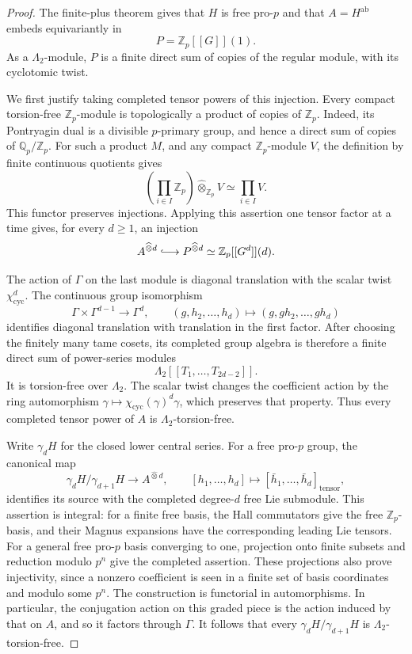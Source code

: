 \begin{proof}
The finite-plus theorem gives that \(H\) is free pro-\(p\) and
that \(A=H^{\mathrm{ab}}\) embeds equivariantly in
\[
 P=\mathbb Z_p[[G]](1).
\]
As a \(\Lambda_2\)-module, \(P\) is a finite direct sum of
copies of the regular module, with its cyclotomic twist.

We first justify taking completed tensor powers of this
injection.  Every compact torsion-free \(\mathbb Z_p\)-module
is topologically a product of copies of \(\mathbb Z_p\).
Indeed, its Pontryagin dual is a divisible \(p\)-primary group,
and hence a direct sum of copies of
\(\mathbb Q_p/\mathbb Z_p\).  For such a product \(M\), and any
compact \(\mathbb Z_p\)-module \(V\), the definition by finite
continuous quotients gives
\[
 \left(\prod_{i\in I}\mathbb Z_p\right)
       \widehat\otimes_{\mathbb Z_p}V
             \simeq\prod_{i\in I}V.
\]
This functor preserves injections.  Applying this assertion
one tensor factor at a time gives, for every \(d\geq1\), an
injection
\[
 A^{\widehat\otimes d}\lhook\joinrel\longrightarrow
 P^{\widehat\otimes d}
     \simeq\mathbb Z_p[[G^d]](d).
\]

The action of \(\Gamma\) on the last module is diagonal
translation with the scalar twist
\(\chi_{\mathrm{cyc}}^d\).  The continuous group isomorphism
\[
 \Gamma\times\Gamma^{d-1}\longrightarrow\Gamma^d,\qquad
 (g,h_2,\ldots,h_d)\longmapsto
                (g,gh_2,\ldots,gh_d)
\]
identifies diagonal translation with translation in the first
factor.  After choosing the finitely many tame cosets, its
completed group algebra is therefore a finite direct sum of
power-series modules
\[
             \Lambda_2[[T_1,\ldots,T_{2d-2}]].
\]
It is torsion-free over \(\Lambda_2\).  The scalar twist changes
the coefficient action by the ring automorphism
\(\gamma\mapsto\chi_{\mathrm{cyc}}(\gamma)^d\gamma\), which
preserves that property.  Thus every completed tensor power
of \(A\) is \(\Lambda_2\)-torsion-free.

Write \(\gamma_dH\) for the closed lower central series.
For a free pro-\(p\) group, the canonical map
\[
 \gamma_dH/\gamma_{d+1}H
        \longrightarrow A^{\widehat\otimes d},
 \qquad
 [h_1,\ldots,h_d]\longmapsto
          [\bar h_1,\ldots,\bar h_d]_{\mathrm{tensor}},
\]
identifies its source with the completed degree-\(d\) free
Lie submodule.  This assertion is integral: for a finite free
basis, the Hall commutators give the free
\(\mathbb Z_p\)-basis, and their Magnus expansions have the
corresponding leading Lie tensors.  For a general free
pro-\(p\) basis converging to one, projection onto finite
subsets and reduction modulo \(p^n\) give the completed
assertion.  These projections also prove injectivity, since a
nonzero coefficient is seen in a finite set of basis
coordinates and modulo some \(p^n\).  The construction is
functorial in automorphisms.  In particular, the conjugation
action on this graded piece is the action induced by that on
\(A\), and so it factors through \(\Gamma\).
It follows that every
\(\gamma_dH/\gamma_{d+1}H\) is
\(\Lambda_2\)-torsion-free.


\end{proof}
